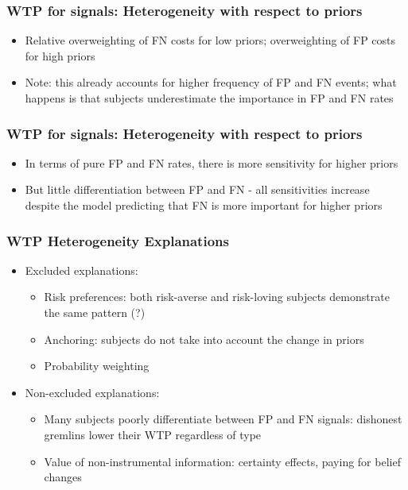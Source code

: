 \documentclass[11pt,hyperref={bookmarks=false}]{beamer}
\begin{document}
\begin{frame}
\frametitle{WTP for signals: Heterogeneity with respect to priors}
\begin{itemize}
\item Relative overweighting of FN costs for low priors; overweighting of FP costs for high priors
\item Note: this already accounts for higher frequency of FP and FN events; what happens is that subjects underestimate the importance in FP and FN rates
\end{itemize}
\footnotesize

\end{frame}


\begin{frame}
\frametitle{WTP for signals: Heterogeneity with respect to priors}
\begin{itemize}
\item In terms of pure FP and FN rates, there is more sensitivity for higher priors
\item But little differentiation between FP and FN - all sensitivities increase despite the model predicting that FN is more important for higher priors
\end{itemize}
\scriptsize

\end{frame}




\begin{frame}
\frametitle{WTP Heterogeneity Explanations}
\begin{itemize}
\item Excluded explanations:
\begin{itemize}
\item Risk preferences: both risk-averse and risk-loving subjects demonstrate the same pattern (?) 
\item Anchoring: subjects do not take into account the change in priors
\item Probability weighting
\end{itemize}
\item Non-excluded explanations: 
\begin{itemize}
\item Many subjects poorly differentiate between FP and FN signals: dishonest gremlins lower their WTP regardless of type
\item Value of non-instrumental information: certainty effects, paying for belief changes
\end{itemize}
\end{itemize}
\end{frame}
\end{document}
